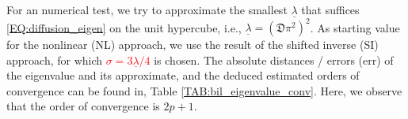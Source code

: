 \documentclass[a4paper, english, 12pt, reqno, draft]{amsart}
\theoremstyle{definition}
\theoremstyle{remark}
\numberwithin{equation}{section}
\newcommand{\setEdge}{\ensuremath{\mathcal E}}
\newcommand{\setNode}{\ensuremath{\mathcal N}}
\newcommand{\setNodeDir}{\ensuremath{\setNode_\textup D}}
\newcommand{\setNodeBar}{\ensuremath{\bar{\mathcal N}}}
\newcommand{\setNodeDirBar}{\ensuremath{\setNodeBar_\textup D}}
\newcommand{\edge}{\ensuremath{E}}
\newcommand{\node}{\ensuremath{N}}
\newcommand{\Edge}{{\ensuremath{\boldsymbol E}}}
\newcommand{\Node}{{\ensuremath{\boldsymbol N}}}
\newcommand{\globDim}{\ensuremath{\mathfrak D}}
\newcommand{\Normal}{\ensuremath{\mathfrak n_\Edge}}
\renewcommand{\vec}[1]{\ensuremath{\boldsymbol{#1}}}
\newcommand{\ds}{\ensuremath{\, \textup d \sigma}}
\newcommand{\localU}{\ensuremath{\mathcal U}}
\newcommand{\localQ}{\ensuremath{\vec{\mathcal Q}}}
\newcommand{\mass}{\ensuremath{\mathfrak m}}
\newcommand{\eigenval}{\ensuremath{\underline \lambda}}
\begin{document}
% 
For an numerical test, we try to approximate the smallest $\eigenval$ that suffices \eqref{EQ:diffusion_eigen} on the unit hypercube, i.e., $\eigenval = (\globDim \pi^2)^2$. As starting value for the nonlinear (NL) approach, we use the result of the shifted inverse (SI) approach, for which \textcolor{red}{$\sigma = 3 \eigenval / 4$} is chosen. The absolute distances / errors (err) of the eigenvalue and its approximate, and the deduced estimated orders of convergence can be found in, Table \ref{TAB:bil_eigenvalue_conv}. Here, we observe that the order of convergence is $2p+1$.
% 
\end{document}
